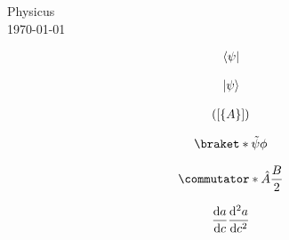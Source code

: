 \documentclass[11pt]{article}
\begin{document}
\begin{center}
    {\Large Physicus} \\ \vspace{5mm}
    \today
\end{center}

\begin{align*}
    \langle\psi\rvert
\end{align*}

\begin{align*}
    \lvert\psi\rangle
\end{align*}

\begin{align*}
    \lparen\lbrack\lbrace A\rbrace\rbrack\rparen
\end{align*}

\begin{align*}
    \braket*{\tilde{\psi}}{\phi}
\end{align*}

\begin{align*}
    \commutator*{\hat{A}}{\frac{B}{2}}
\end{align*}

\begin{align*}
    \dv{a}{c}\dv[2]{a}{c}
\end{align*}
\end{document}
